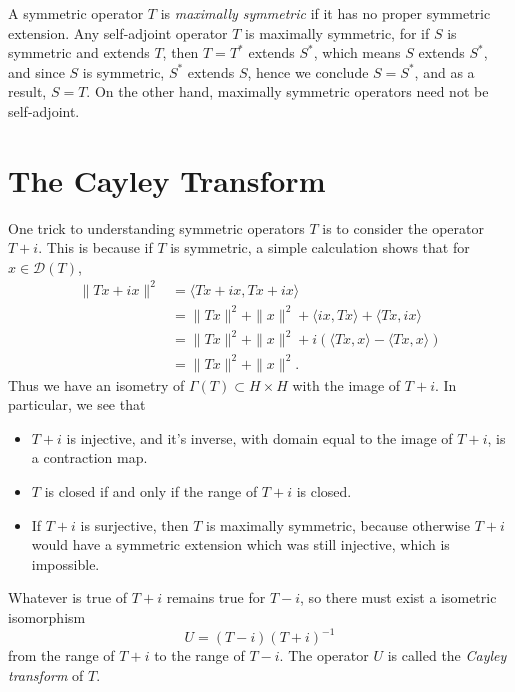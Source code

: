 A symmetric operator $T$ is \emph{maximally symmetric} if it has no proper symmetric extension. Any self-adjoint operator $T$ is maximally symmetric, for if $S$ is symmetric and extends $T$, then $T = T^*$ extends $S^*$, which means $S$ extends $S^*$, and since $S$ is symmetric, $S^*$ extends $S$, hence we conclude $S = S^*$, and as a result, $S = T$. On the other hand, maximally symmetric operators need not be self-adjoint.

\section{The Cayley Transform}

One trick to understanding symmetric operators $T$ is to consider the operator $T + i$. This is because if $T$ is symmetric, a simple calculation shows that for $x \in \mathcal{D}(T)$,
%
\begin{align*}
    \| Tx + i x \|^2 &= \langle Tx + i x, Tx + ix \rangle\\
    &= \| Tx \|^2 + \| x \|^2 + \langle ix, Tx \rangle + \langle Tx, ix \rangle\\
    &= \| Tx \|^2 + \| x \|^2 + i \left( \langle Tx, x \rangle - \langle Tx, x \rangle \right)\\
    &= \| Tx \|^2 + \| x \|^2.
\end{align*}
%
Thus we have an isometry of $\Gamma(T) \subset H \times H$ with the image of $T + i$. In particular, we see that
%
\begin{itemize}
    \item $T + i$ is injective, and it's inverse, with domain equal to the image of $T + i$, is a contraction map.
    \item $T$ is closed if and only if the range of $T + i$ is closed.
    \item If $T + i$ is surjective, then $T$ is maximally symmetric, because otherwise $T + i$ would have a symmetric extension which was still injective, which is impossible.
\end{itemize}
%
Whatever is true of $T + i$ remains true for $T - i$, so there must exist a isometric isomorphism
%
\[ U = (T - i) (T + i)^{-1} \]
%
from the range of $T + i$ to the range of $T - i$. The operator $U$ is called the \emph{Cayley transform} of $T$.

